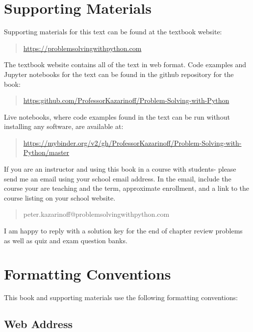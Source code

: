 \documentclass{book}
\begin{document}
    \section{Supporting Materials}\label{supporting-materials}

    Supporting materials for this text can be found at the textbook website:

\begin{quote}
\url{https://problemsolvingwithpython.com}
\end{quote}

The textbook website contains all of the text in web format. Code
examples and Jupyter notebooks for the text can be found in the github
repository for the book:

\begin{quote}
\url{https:github.com/ProfessorKazarinoff/Problem-Solving-with-Python}
\end{quote}

Live notebooks, where code examples found in the text can be run without
installing any software, are available at:

\begin{quote}
\url{https://mybinder.org/v2/gh/ProfessorKazarinoff/Problem-Solving-with-Python/master}
\end{quote}

If you are an instructor and using this book in a course with students-
please send me an email using your school email address. In the email,
include the course your are teaching and the term, approximate
enrollment, and a link to the course listing on your school website.

\begin{quote}
peter.kazarinoff@problemsolvingwithpython.com
\end{quote}

I am happy to reply with a solution key for the end of chapter review
problems as well as quiz and exam question banks.

    \section{Formatting Conventions}\label{formatting-conventions}

    This book and supporting materials use the following formatting
conventions:

    \subsection{Web Address}\label{web-address}
\end{document}
